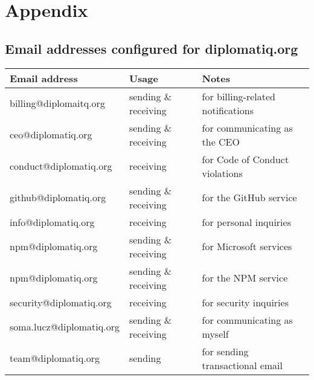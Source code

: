 \appendix
\chapter*{Appendix}
{}
\renewcommand{\thesection}{\Alph{section}}

\section{Email addresses configured for diplomatiq.org}

\begin{table}[!htb]
    \centering
    \begin{tabular}{l|l|l}
        \toprule
        \textbf{Email address}      & \textbf{Usage}            & \textbf{Notes} \\
        \midrule
        billing@diplomaitq.org     & sending \& receiving      & for billing-related notifications \\
        ceo@diplomatiq.org         & sending \& receiving      & for communicating as the CEO \\
        conduct@diplomatiq.org     & receiving                 & for Code of Conduct violations \\
        github@diplomatiq.org      & sending \& receiving      & for the GitHub service \\
        info@diplomatiq.org        & receiving                 & for personal inquiries \\
        npm@diplomatiq.org         & sending \& receiving      & for Microsoft services \\
        npm@diplomatiq.org         & sending \& receiving      & for the NPM service \\
        security@diplomatiq.org    & receiving                 & for security inquiries \\
        soma.lucz@diplomatiq.org   & sending \& receiving      & for communicating as myself \\
        team@diplomatiq.org        & sending                   & for sending transactional email \\
        \bottomrule
    \end{tabular}
\end{table}
